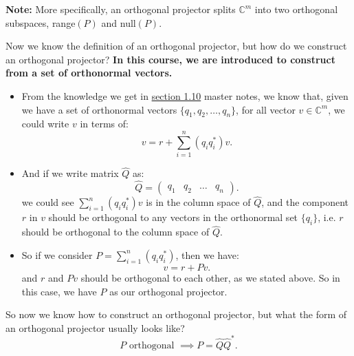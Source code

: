 \noindent \textbf{Note:} More specifically, an orthogonal projector splits $\mathbb{C}^{m}$ into two orthogonal subspaces, range$(P)$ and null$(P)$.

\bigskip
\noindent Now we know the definition of an orthogonal projector, but how do we construct an orthogonal projector? \textbf{In this course, we are introduced to construct from a set of orthonormal vectors.} 
\begin{itemize}
\item From the knowledge we get in \href{https://comp-lin-alg.github.io/L1_preliminaries.html#constructing-orthogonal-projectors-from-sets-of-orthonormal-vectors}{section 1.10} master notes, we know that, given we have a set of orthonormal vectors $\{q_1, q_2, \ldots, q_n\}$, for all vector $v \in \mathbb{C}^{m}$, we could write $v$ in terms of:
  \[
    v = r + \sum_{i = 1}^{n} (q_iq_i^{*})v
  .\] 
\item And if we write matrix $\hat{Q}$ as:
  \[
    \hat{Q} = \begin{pmatrix} q_1 & q_2 & \ldots & q_n \end{pmatrix} 
  .\]
  we could see $\sum_{i=1}^{n} (q_iq_i^{*})v$ is in the column space of $\hat{Q}$, and the component $r$ in $v$ should be orthogonal to any vectors in the orthonormal set $ \{q_i\} $, i.e. $r$ should be orthogonal to the column space of $\hat{Q}$.
  \item So if we consider $P = \sum_{i=1}^{n} (q_iq_i^{*})$, then we have:
    \[
    v = r + Pv
    .\] 
    and $r$ and $Pv$ should be orthogonal to each other, as we stated above. So in this case, we have $P$ as our orthogonal projector.
\end{itemize}
So now we know how to construct an orthogonal projector, but what the form of an orthogonal projector usually looks like?
\[
P \text{ orthogonal } \implies P = \hat{Q}\hat{Q}^{*}
.\] 
